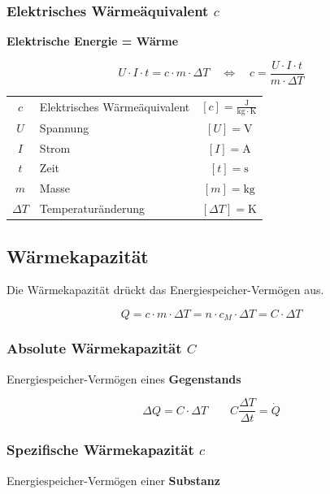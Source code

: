 \subsubsection{Elektrisches Wärmeäquivalent $c$}
\textbf{Elektrische Energie = Wärme}

$$ U \cdot I \cdot t = c \cdot m \cdot \Delta T \quad \Leftrightarrow \quad c = \frac{U \cdot I \cdot t}{m \cdot \Delta T}$$

\begin{tabular}{c l c}
	\rule{0pt}{8pt}$c$ & Elektrisches Wärmeäquivalent & $[c] = \mathrm{\frac{J}{kg \cdot K}}$ \\
	$U$ & Spannung & $[U] = \mathrm{V}$ \\
	$I$ & Strom & $[I] = \mathrm{A}$ \\
	$t$ & Zeit & $[t] = \mathrm{s}$ \\
	$m$ & Masse & $[m] = \mathrm{kg}$ \\
	$\Delta T$ & Temperaturänderung & $[\Delta T] = \mathrm{K}$ \\
\end{tabular}



\subsection{Wärmekapazität}
Die Wärmekapazität drückt das Energiespeicher-Vermögen aus.

$$ \boxed{ Q = c \cdot m \cdot \Delta T = n \cdot c_M \cdot \Delta T = C \cdot \Delta T  }$$


\subsubsection{Absolute Wärmekapazität $C$}
Energiespeicher-Vermögen eines \textbf{Gegenstands}

$$ \boxed{ \Delta Q = C \cdot \Delta T \quad \quad C\frac{\Delta T}{\Delta t} = \dot{Q}} $$


\subsubsection{Spezifische Wärmekapazität $c$}
Energiespeicher-Vermögen einer \textbf{Substanz}

